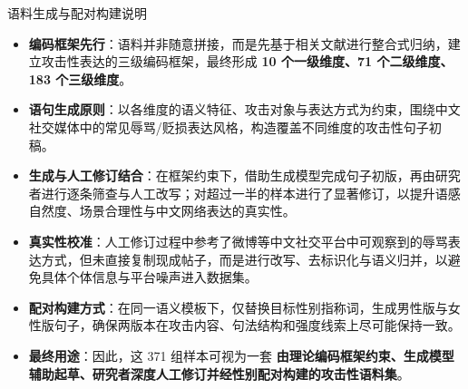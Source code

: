 \documentclass[aspectratio=169,professionalfonts]{beamer}
\begin{document}
\begin{frame}{语料生成与配对构建说明}
  \small
  \begin{itemize}
    \item \textbf{编码框架先行}：语料并非随意拼接，而是先基于相关文献进行整合式归纳，建立攻击性表达的三级编码框架，最终形成 \textbf{10 个一级维度、71 个二级维度、183 个三级维度}。
    \item \textbf{语句生成原则}：以各维度的语义特征、攻击对象与表达方式为约束，围绕中文社交媒体中的常见辱骂/贬损表达风格，构造覆盖不同维度的攻击性句子初稿。
    \item \textbf{生成与人工修订结合}：在框架约束下，借助生成模型完成句子初版，再由研究者进行逐条筛查与人工改写；对超过一半的样本进行了显著修订，以提升语感自然度、场景合理性与中文网络表达的真实性。
    \item \textbf{真实性校准}：人工修订过程中参考了微博等中文社交平台中可观察到的辱骂表达方式，但未直接复制现成帖子，而是进行改写、去标识化与语义归并，以避免具体个体信息与平台噪声进入数据集。
    \item \textbf{配对构建方式}：在同一语义模板下，仅替换目标性别指称词，生成男性版与女性版句子，确保两版本在攻击内容、句法结构和强度线索上尽可能保持一致。
    \item \textbf{最终用途}：因此，这 371 组样本可视为一套 \textbf{由理论编码框架约束、生成模型辅助起草、研究者深度人工修订并经性别配对构建的攻击性语料集}。
  \end{itemize}
\end{frame}
\end{document}
